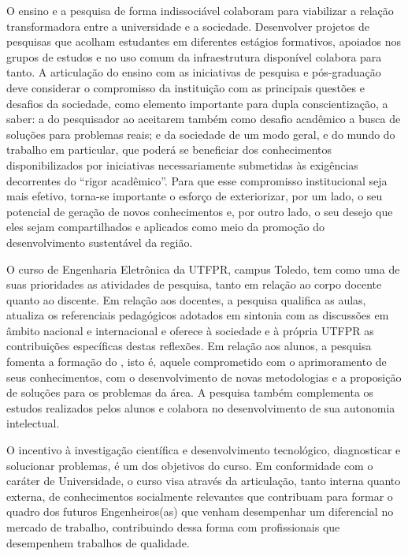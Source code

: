 O ensino e a pesquisa de forma indissociável colaboram para viabilizar a relação transformadora entre a universidade e a sociedade. Desenvolver projetos de pesquisas que acolham estudantes em diferentes estágios formativos, apoiados nos grupos de estudos e no uso comum da infraestrutura disponível colabora para tanto. A articulação do ensino com as iniciativas de pesquisa e pós-graduação deve considerar o compromisso da instituição com as principais questões e desafios da sociedade, como elemento importante para dupla conscientização, a saber: a do pesquisador ao aceitarem também como desafio acadêmico a busca de soluções para problemas reais; e da sociedade de um modo geral, e do mundo do trabalho em particular, que poderá se beneficiar dos conhecimentos disponibilizados por iniciativas necessariamente submetidas às exigências decorrentes do ``rigor acadêmico''. Para que esse compromisso institucional seja mais efetivo, torna-se importante o esforço de exteriorizar, por um lado, o seu potencial de geração de novos conhecimentos e, por outro lado, o seu desejo que eles sejam compartilhados e aplicados como meio da promoção do desenvolvimento sustentável da região.

O curso de Engenharia Eletrônica da UTFPR, campus Toledo, tem como uma de suas prioridades as atividades de pesquisa, tanto em relação ao corpo docente quanto ao discente. Em relação aos docentes, a pesquisa qualifica as aulas, atualiza os referenciais pedagógicos adotados em sintonia com as discussões em âmbito nacional e internacional e oferece à sociedade e à própria UTFPR as contribuições específicas destas reflexões. Em relação aos alunos, a pesquisa fomenta a formação do , isto é, aquele comprometido com o aprimoramento de seus conhecimentos, com o desenvolvimento de novas metodologias e a proposição de soluções para os problemas da área. A pesquisa também complementa os estudos realizados pelos alunos e colabora no desenvolvimento de sua autonomia intelectual.

O incentivo à investigação científica e desenvolvimento tecnológico, diagnosticar e solucionar problemas, é um dos objetivos do curso. Em conformidade com o caráter de Universidade, o curso visa através da articulação, tanto interna quanto externa, de conhecimentos socialmente relevantes que contribuam para formar o quadro dos futuros Engenheiros(as) que venham desempenhar um diferencial no mercado de trabalho, contribuindo dessa forma com profissionais que desempenhem trabalhos de qualidade.

